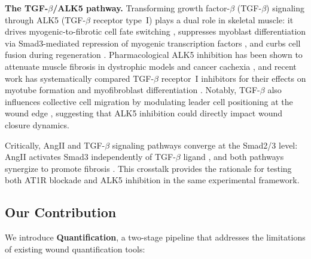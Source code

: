 \textbf{The TGF-$\beta$/ALK5 pathway.}
Transforming growth factor-$\beta$ (TGF-$\beta$) signaling through ALK5
(TGF-$\beta$ receptor type~I) plays a dual role in skeletal muscle:
it drives myogenic-to-fibrotic cell fate switching \citep{Li2004,Loiselle2009},
suppresses myoblast differentiation via Smad3-mediated repression of myogenic transcription
factors \citep{McFarland2001}, and curbs cell fusion during regeneration \citep{Girardi2021}.
Pharmacological ALK5 inhibition has been shown to attenuate muscle fibrosis in dystrophic
models \citep{Ceco2013,Cohn2007} and cancer cachexia \citep{LachTrifilieff2019},
and recent work has systematically compared TGF-$\beta$ receptor~I inhibitors for their effects
on myotube formation \citep{Weiss2025a} and myofibroblast differentiation \citep{Weiss2025b}.
Notably, TGF-$\beta$ also influences collective cell migration by modulating leader cell
positioning at the wound edge \citep{Vishwakarma2014}, suggesting that ALK5 inhibition could
directly impact wound closure dynamics.

Critically, AngII and TGF-$\beta$ signaling pathways converge at the Smad2/3 level:
AngII activates Smad3 independently of TGF-$\beta$ ligand
\citep{RodriguezVita2005,Wang2008}, and both pathways synergize to promote fibrosis
\citep{Murphy2015}.
This crosstalk provides the rationale for testing both AT1R blockade and ALK5 inhibition in
the same experimental framework.

\subsection{Our Contribution}

We introduce \textbf{Quantification}, a two-stage pipeline that addresses the limitations of
existing wound quantification tools:

